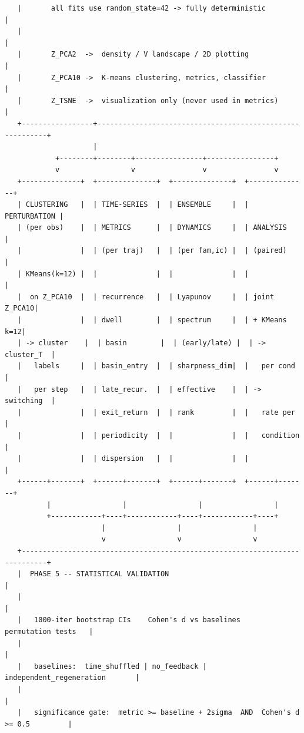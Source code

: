 \documentclass{article}
\theoremstyle{plain}
\theoremstyle{definition}
\begin{document}
\begin{verbatim}
   |       all fits use random_state=42 -> fully deterministic                   |
   |                                                                            |
   |       Z_PCA2  ->  density / V landscape / 2D plotting                       |
   |       Z_PCA10 ->  K-means clustering, metrics, classifier                   |
   |       Z_TSNE  ->  visualization only (never used in metrics)                |
   +-----------------+----------------------------------------------------------+
                     |
            +--------+--------+----------------+----------------+
            v                 v                v                v
   +--------------+  +--------------+  +--------------+  +--------------+
   | CLUSTERING   |  | TIME-SERIES  |  | ENSEMBLE     |  | PERTURBATION |
   | (per obs)    |  | METRICS      |  | DYNAMICS     |  | ANALYSIS     |
   |              |  | (per traj)   |  | (per fam,ic) |  | (paired)     |
   | KMeans(k=12) |  |              |  |              |  |              |
   |  on Z_PCA10  |  | recurrence   |  | Lyapunov     |  | joint Z_PCA10|
   |              |  | dwell        |  | spectrum     |  | + KMeans k=12|
   | -> cluster    |  | basin        |  | (early/late) |  | -> cluster_T  |
   |   labels     |  | basin_entry  |  | sharpness_dim|  |   per cond   |
   |   per step   |  | late_recur.  |  | effective    |  | -> switching  |
   |              |  | exit_return  |  | rank         |  |   rate per   |
   |              |  | periodicity  |  |              |  |   condition  |
   |              |  | dispersion   |  |              |  |              |
   +------+-------+  +------+-------+  +------+-------+  +------+-------+
          |                 |                 |                 |
          +------------+----+------------+----+------------+----+
                       |                 |                 |
                       v                 v                 v
   +----------------------------------------------------------------------------+
   |  PHASE 5 -- STATISTICAL VALIDATION                                          |
   |                                                                            |
   |   1000-iter bootstrap CIs    Cohen's d vs baselines    permutation tests   |
   |                                                                            |
   |   baselines:  time_shuffled | no_feedback | independent_regeneration       |
   |                                                                            |
   |   significance gate:  metric >= baseline + 2sigma  AND  Cohen's d >= 0.5         |

\end{verbatim}
\end{document}
